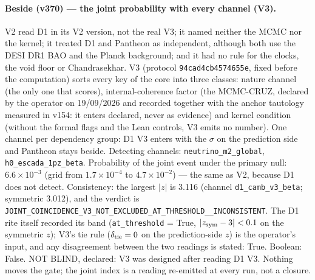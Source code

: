 \documentclass[11pt]{article}
\theoremstyle{definition}\newtheorem{deriv}{Derivation}
\begin{document}
\paragraph*{Beside (v370) --- the joint probability with every channel (V3).} V2 read D1 in its V2 version, not the real V3; it named neither the MCMC nor the kernel; it treated D1 and Pantheon as independent, although both use the DESI DR1 BAO and the Planck background; and it had no rule for the clocks, the void floor or Chandrasekhar. V3 (protocol \texttt{94cad4cb4574655e}, fixed before the computation) sorts every key of the core into three classes: nature channel (the only one that scores), internal-coherence factor (the MCMC-CRUZ, declared by the operator on 19/09/2026 and recorded together with the anchor tautology measured in v154: it enters declared, never as evidence) and kernel condition (without the formal flags and the Lean controls, V3 emits no number). One channel per dependency group: D1 V3 enters with the $\sigma$ on the prediction side and Pantheon stays beside. Detecting channels: \texttt{neutrino\_m2\_global}, \texttt{h0\_escada\_1pz\_beta}. Probability of the joint event under the primary null: $6.6\times10^{-3}$ (grid from $1.7\times10^{-4}$ to $4.7\times10^{-2}$) --- the same as V2, because D1 does not detect. Consistency: the largest $|z|$ is 3.116 (channel \texttt{d1\_camb\_v3\_beta}; symmetric 3.012), and the verdict is \texttt{JOINT\_COINCIDENCE\_V3\_NOT\_EXCLUDED\_AT\_THRESHOLD\_\_INCONSISTENT}. The D1 rite itself recorded its band (\texttt{at\_threshold} = True, $|z_{\rm sym}-3|<0.1$ on the symmetric $z$); V3's tie rule ($\delta_{\rm tie}=0$ on the prediction-side $z$) is the operator's input, and any disagreement between the two readings is stated: True. Boolean: False. NOT BLIND, declared: V3 was designed after reading D1 V3. Nothing moves the gate; the joint index is a reading re-emitted at every run, not a closure.
\end{document}

